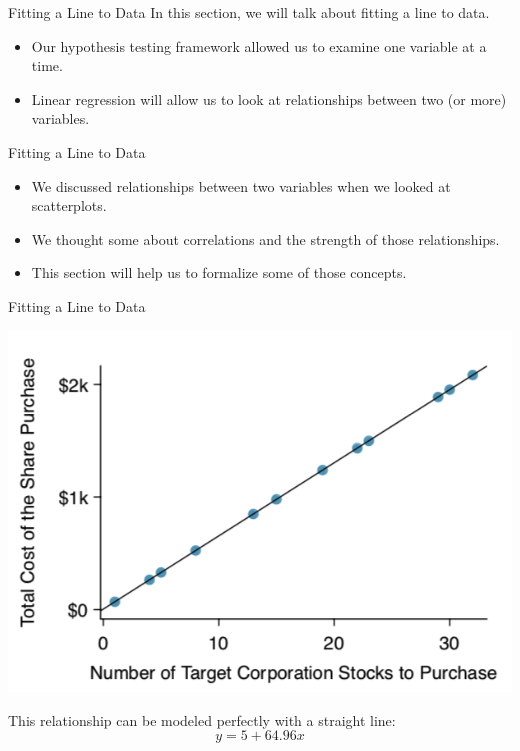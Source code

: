 \begin{frame}{Fitting a Line to Data}
    In this section, we will talk about fitting a line to data.
    \begin{itemize}
        \item Our hypothesis testing framework allowed us to examine one variable at a time.
        \item Linear regression will allow us to look at relationships between two (or more) variables.
    \end{itemize}
\end{frame}

\begin{frame}{Fitting a Line to Data}
    \begin{itemize}
        \item We discussed relationships between two variables when we looked at scatterplots.
        \item We thought some about correlations and the strength of those relationships.
        \item This section will help us to formalize some of those concepts.
    \end{itemize}
\end{frame}

\begin{frame}{Fitting a Line to Data}
    \begin{center}
        \includegraphics[scale=0.35]{images/perfectcorr.png}
    \end{center}
    This relationship can be modeled perfectly with a straight line:
    \[
        y = 5 + 64.96x
    \]
\end{frame}

